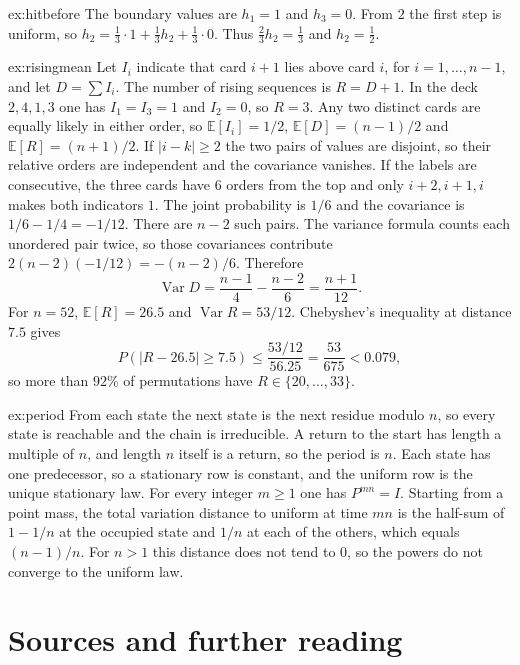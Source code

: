 \begin{solution}{ex:hitbefore}
\writeup The boundary values are $h_1=1$ and $h_3=0$. From $2$ the first step is uniform, so $h_2=\frac13\cdot1+\frac13 h_2+\frac13\cdot0$. Thus $\frac23 h_2=\frac13$ and $h_2=\frac12$.
\end{solution}

\begin{solution}{ex:risingmean}
\writeup Let $I_i$ indicate that card $i+1$ lies above card $i$, for $i=1,\ldots,n-1$, and let $D=\sum I_i$. The number of rising sequences is $R=D+1$. In the deck $2,4,1,3$ one has $I_1=I_3=1$ and $I_2=0$, so $R=3$. Any two distinct cards are equally likely in either order, so $\mathbb E[I_i]=1/2$, $\mathbb E[D]=(n-1)/2$ and $\mathbb E[R]=(n+1)/2$. If $|i-k|\ge2$ the two pairs of values are disjoint, so their relative orders are independent and the covariance vanishes. If the labels are consecutive, the three cards have $6$ orders from the top and only $i+2,i+1,i$ makes both indicators $1$. The joint probability is $1/6$ and the covariance is $1/6-1/4=-1/12$. There are $n-2$ such pairs. The variance formula counts each unordered pair twice, so those covariances contribute $2(n-2)(-1/12)=-(n-2)/6$. Therefore
\[
 \operatorname{Var}D=\frac{n-1}{4}-\frac{n-2}{6}=\frac{n+1}{12}.
\]
For $n=52$, $\mathbb E[R]=26.5$ and $\operatorname{Var}R=53/12$. Chebyshev's inequality at distance $7.5$ gives
\[
 P(|R-26.5|\ge 7.5)\le\frac{53/12}{56.25}=\frac{53}{675}<0.079,
\]
so more than $92\%$ of permutations have $R\in\{20,\ldots,33\}$.
\end{solution}

\begin{solution}{ex:period}
\writeup From each state the next state is the next residue modulo $n$, so every state is reachable and the chain is irreducible. A return to the start has length a multiple of $n$, and length $n$ itself is a return, so the period is $n$. Each state has one predecessor, so a stationary row is constant, and the uniform row is the unique stationary law. For every integer $m\ge1$ one has $P^{mn}=I$. Starting from a point mass, the total variation distance to uniform at time $mn$ is the half-sum of $1-1/n$ at the occupied state and $1/n$ at each of the others, which equals $(n-1)/n$. For $n>1$ this distance does not tend to $0$, so the powers do not converge to the uniform law.
\end{solution}

\section*{Sources and further reading}

